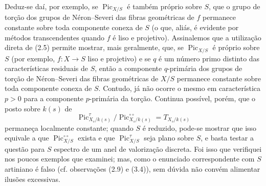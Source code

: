  Deduz-se daí, por exemplo, se
$\operatorname{Pic}_{X/S}$ é também próprio sobre $S$, que o grupo de torção
dos grupos de Néron--Severi das fibras geométricas de $f$ permanece constante
sobre toda componente conexa de $S$ (o que, aliás, é evidente por métodos
transcendentes quando $f$ é liso e projetivo). Assinalemos que a utilização
direta de (2.5) permite mostrar, mais geralmente, que, se
$\operatorname{Pic}_{X/S}$ é próprio sobre $S$ (por exemplo,
$f:X\longrightarrow S$ liso e projetivo) e se $q$ é um número primo distinto
das características residuais de $S$, então a componente $q$-primária dos
grupos de torção de Néron--Severi das fibras geométricas de $X/S$ permanece
constante sobre toda componente conexa de $S$. Contudo, já não ocorre o mesmo
em característica $p>0$ para a componente $p$-primária da torção. Continua
possível, porém, que o posto sobre $k(s)$ de
\[
\operatorname{Pic}_{X_s/k(s)}^\tau/
\operatorname{Pic}_{X_s/k(s)}^{\circ\circ}=T_{X_s/k(s)}
\]
permaneça localmente constante; quando $S$ é reduzido, pode-se mostrar que isso
equivale a que $\operatorname{Pic}_{X/S}^{\circ\circ}$ exista e que
$\operatorname{Pic}_{X/S}^\tau$ seja plano sobre $S$, e basta testar a questão
para $S$ espectro de um anel de valorização discreta. Foi isso que verifiquei
nos poucos exemplos que examinei; mas, como o enunciado correspondente com $S$
artiniano é falso (cf. observações (2.9) e (3.4)), sem dúvida não convém
alimentar ilusões excessivas.


